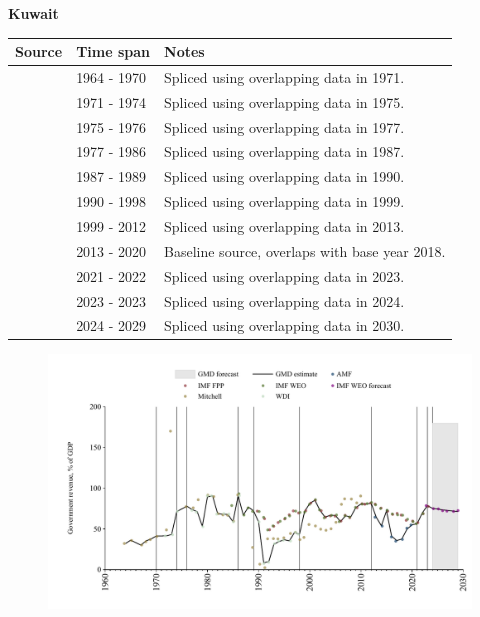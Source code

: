 \documentclass[12pt,a4paper,landscape]{article}
\begin{document}
\begin{adjustbox}{max totalsize={\paperwidth}{\paperheight},center}
\begin{minipage}[t][\textheight][t]{\textwidth}
\vspace*{0.5cm}
{}
\begin{center}
{\Large\bfseries Kuwait}
\end{center}
\vspace{0.5cm}
\begin{table}[H]
\centering
\small
\begin{tabular}{|l|l|l|}
\hline
\textbf{Source} & \textbf{Time span} & \textbf{Notes} \\
\hline
\rowcolor{white}\cite{Mitchell}& 1964 - 1970 &Spliced using overlapping data in 1971.\\
\rowcolor{lightgray}\cite{WDI}& 1971 - 1974 &Spliced using overlapping data in 1975.\\
\rowcolor{white}\cite{Mitchell}& 1975 - 1976 &Spliced using overlapping data in 1977.\\
\rowcolor{lightgray}\cite{WDI}& 1977 - 1986 &Spliced using overlapping data in 1987.\\
\rowcolor{white}\cite{IMF_WEO}& 1987 - 1989 &Spliced using overlapping data in 1990.\\
\rowcolor{lightgray}\cite{WDI}& 1990 - 1998 &Spliced using overlapping data in 1999.\\
\rowcolor{white}\cite{IMF_WEO}& 1999 - 2012 &Spliced using overlapping data in 2013.\\
\rowcolor{lightgray}\cite{AMF}& 2013 - 2020 &Baseline source, overlaps with base year 2018.\\
\rowcolor{white}\cite{IMF_WEO}& 2021 - 2022 &Spliced using overlapping data in 2023.\\
\rowcolor{lightgray}\cite{IMF_FPP}& 2023 - 2023 &Spliced using overlapping data in 2024.\\
\rowcolor{white}\cite{IMF_WEO_forecast}& 2024 - 2029 &Spliced using overlapping data in 2030.\\
\hline
\end{tabular}
\end{table}
\begin{figure}[H]
\centering
\includegraphics[width=\textwidth,height=0.6\textheight,keepaspectratio]{graphs/KWT_govrev_GDP.pdf}
\end{figure}
\end{minipage}
\end{adjustbox}
\end{document}
